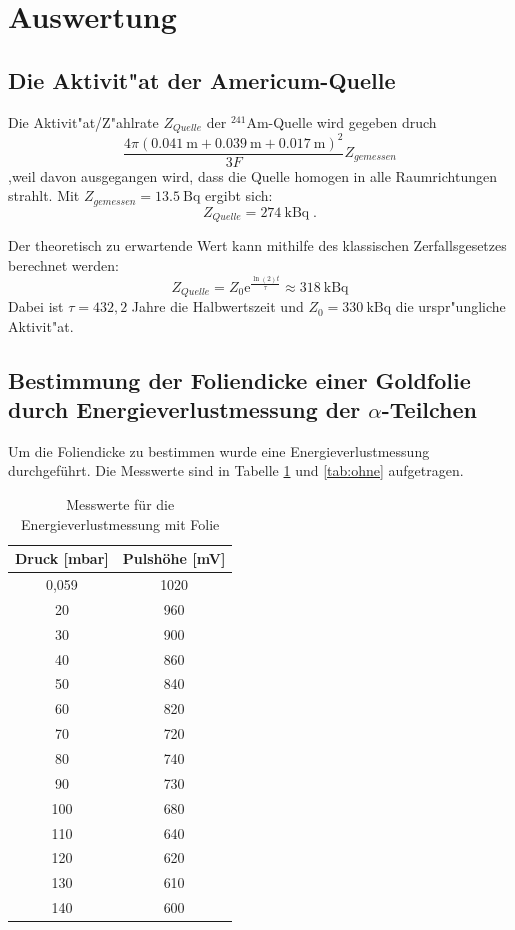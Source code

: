 \section{Auswertung}
\label{sec:Auswertung}

\subsection{Die Aktivit"at der Americum-Quelle}
  Die Aktivit"at/Z"ahlrate $Z_{Quelle}$ der $^{241}\text{Am}$-Quelle wird gegeben druch
  \begin{equation}
    \frac{4\pi(\SI{0,041}{\meter}+\SI{0,039}{\meter}+\SI{0.017}{\meter})^2}{3F}Z_{gemessen}
  \end{equation}
  ,weil davon ausgegangen wird, dass die Quelle homogen in alle Raumrichtungen strahlt.
  Mit $Z_{gemessen}=\SI{13,5}{\becquerel}$ ergibt sich:
  \begin{equation}
    Z_{Quelle} = \SI{274}{\kilo \becquerel} \; .
  \end{equation}

  Der theoretisch zu erwartende Wert kann mithilfe des klassischen Zerfallsgesetzes berechnet werden:
  \begin{equation}
    Z_{Quelle} = Z_0\text{e}^{\frac{\ln(2)t}{\tau}} \approx \SI{318}{\kilo \becquerel}
  \end{equation}
  Dabei ist $\tau=432,2$ Jahre die Halbwertszeit und $Z_0=\SI{330}{\kilo \becquerel}$ \cite{Anleitung} die urspr"ungliche Aktivit"at.


\subsection{\texorpdfstring{Bestimmung der Foliendicke einer Goldfolie durch Energieverlustmessung der $\alpha$-Teilchen}{Bestimmung der Foliendicke einer Goldfolie durch Energieverlustmessung der alpha-Teilchen}}
Um die Foliendicke zu bestimmen wurde eine Energieverlustmessung durchgeführt. Die Messwerte sind in Tabelle \ref{tab:mit} und \ref{tab:ohne} aufgetragen.
\begin{table}[H]
	\centering
	\begin{tabular}{c|c}

		Druck  [mbar]& Pulshöhe [mV] \\
		\hline
0,059	&1020 \\
20	&960 \\
30	&900\\
40	&860\\
50	&840\\
60	&820\\
70	&720\\
80	&740\\
90	&730\\
100	&680\\
110	&640\\
120	&620\\
130	&610\\
140	&600\\

	\end{tabular}
	\caption{Messwerte für die Energieverlustmessung mit Folie }
	  \label{tab:mit}
\end{table}

